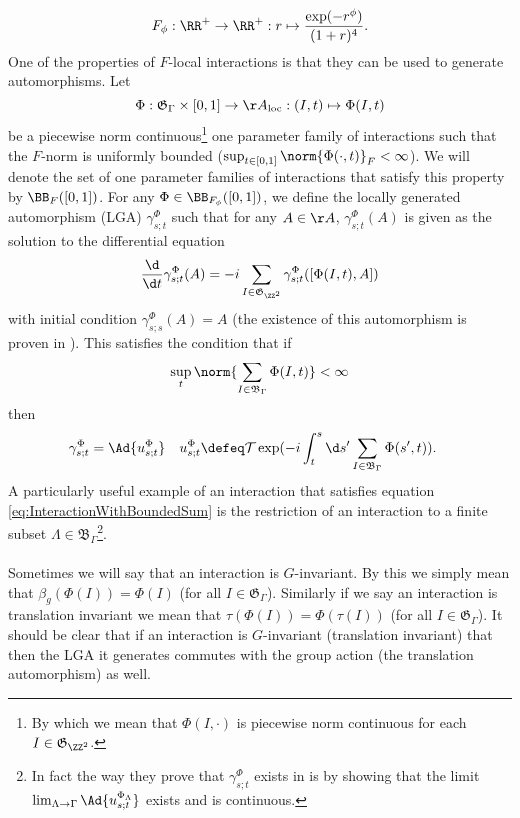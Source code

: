 \begin{equation}\label{eq:OurFFunction}
	F_\phi:\RR^+\rightarrow\RR^+:r\mapsto \frac{\exp(-r^\phi)}{(1+r)^4}.
\end{equation}
One of the properties of $F$-local interactions is that they can be used to generate automorphisms. Let
\begin{equation}
	\Phi:\mathfrak{G}_{\Gamma}\times [0,1]\rightarrow \AA_{\text{loc}}:(I,t)\mapsto \Phi(I,t)
\end{equation}
be a piecewise norm continuous\footnote{By which we mean that $\Phi(I,\cdot)$ is piecewise norm continuous for each $I\in\mathfrak{G}_{\ZZ^2}$.} one parameter family of interactions such that the $F$-norm is uniformly bounded ($\sup_{t\in[0,1]}\norm{\Phi(\cdot,t)}_F<\infty$). We will denote the set of one parameter families of interactions that satisfy this property by $\BB_{F}([0,1])$. For any $\Phi\in\BB_{F_\phi}([0,1])$, we define the locally generated automorphism (LGA) $\gamma^{\Phi}_{s;t}$ such that for any $A\in\AA$, $\gamma^{\Phi}_{s;t}(A)$ is given as the solution to the differential equation
\begin{equation}
	\frac{\d}{\d t}\gamma^{\Phi}_{s;t}(A)=-i\sum_{I\in\mathfrak{G}_{\ZZ^2}}\gamma^{\Phi}_{s;t}([\Phi(I,t),A])
\end{equation}
with initial condition $\gamma^{\Phi}_{s;s}(A)=A$ (the existence of this automorphism is proven in \cite{nachtergaele2019quasi}). This satisfies the condition that if
\begin{equation}\label{eq:InteractionWithBoundedSum}
	\sup_t\norm{\sum_{I\in\mathfrak{B}_{\Gamma}}\Phi(I,t)}<\infty
\end{equation}
then
\begin{align}
	\gamma^\Phi_{s;t}&=\Ad{u^\Phi_{s;t}}&u^\Phi_{s;t}&\defeq\mathcal{T}\exp(-i\int_t^s\d s'\sum_{I\in\mathfrak{B}_{\Gamma}}\Phi(s',t)).
\end{align}
A particularly useful example of an interaction that satisfies equation \eqref{eq:InteractionWithBoundedSum} is the restriction of an interaction to a finite subset $\Lambda\in\mathfrak{B}_\Gamma$\footnote{In fact the way they prove that $\gamma^\Phi_{s;t}$ exists in \cite{nachtergaele2019quasi} is by showing that the limit $\lim_{\Lambda\rightarrow\Gamma}\Ad{u^{\Phi_\Lambda}_{s;t}}$ exists and is continuous.}.\\\\
Sometimes we will say that an interaction is $G$-invariant. By this we simply mean that $\beta_g(\Phi(I))=\Phi(I)$ (for all $I\in\mathfrak{G}_{\Gamma}$). Similarly if we say an interaction is translation invariant we mean that $\tau(\Phi(I))=\Phi(\tau(I))$ (for all $I\in\mathfrak{G}_{\Gamma}$). It should be clear that if an interaction is $G$-invariant (translation invariant) that then the LGA it generates commutes with the group action (the translation automorphism) as well.
